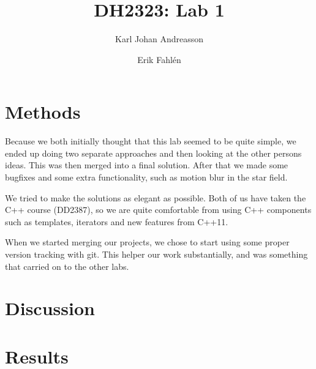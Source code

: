 \documentclass[a4paper]{article}
\begin{document}
\title{DH2323: Lab 1}
\author{Karl Johan Andreasson \and Erik Fahlén}

\maketitle
\clearpage

\section{Methods}
Because we both initially thought that this lab seemed to be quite simple, we ended up doing two separate approaches and then looking at the other persons ideas.
This was then merged into a final solution.
After that we made some bugfixes and some extra functionality, such as motion blur in the star field.

We tried to make the solutions as elegant as possible.
Both of us have taken the C++ course (DD2387), so we are quite comfortable from using C++ components such as templates, iterators and new features from C++11.

When we started merging our projects, we chose to start using some proper version tracking with git. This helper our work substantially, and was something that carried on to the other labs.

\section{Discussion}

\section{Results}
\end{document}
